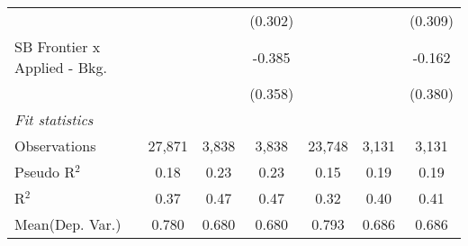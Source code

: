 \begin{tabular}{lcccccc}
                                  &                &                & (0.302)        &                &               & (0.309)\\   
   SB Frontier x Applied - Bkg.   &                &                & -0.385         &                &               & -0.162\\   
                                  &                &                & (0.358)        &                &               & (0.380)\\   
   \midrule
   \emph{Fit statistics}\\
   Observations                   & 27,871         & 3,838          & 3,838          & 23,748         & 3,131         & 3,131\\  
   Pseudo R$^2$                   & 0.18           & 0.23           & 0.23           & 0.15           & 0.19          & 0.19\\  
   R$^2$                          & 0.37           & 0.47           & 0.47           & 0.32           & 0.40          & 0.41\\  
Mean(Dep. Var.) & 0.780 & 0.680 & 0.680 & 0.793 & 0.686 & 0.686 \\
   

\end{tabular}

